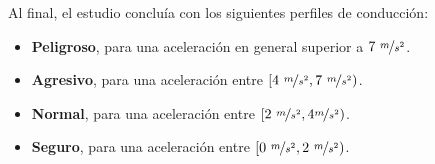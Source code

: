 Al final, el estudio concluía con los siguientes perfiles de conducción:

\begin{itemize}
  \item \textbf{Peligroso}, para una aceleración en general superior a $7\ \nicefrac{m}{s^2}$.
  \item \textbf{Agresivo}, para una aceleración entre $\left[4\ \nicefrac{m}{s^2}, 7\ \nicefrac{m}{s^2}\right)$.
  \item \textbf{Normal}, para una aceleración entre $\left[2\ \nicefrac{m}{s^2}, 4 \nicefrac{m}{s^2}\right)$.
  \item \textbf{Seguro}, para una aceleración entre $\left[0\ \nicefrac{m}{s^2}, 2\ \nicefrac{m}{s^2}\right)$.
\end{itemize}
